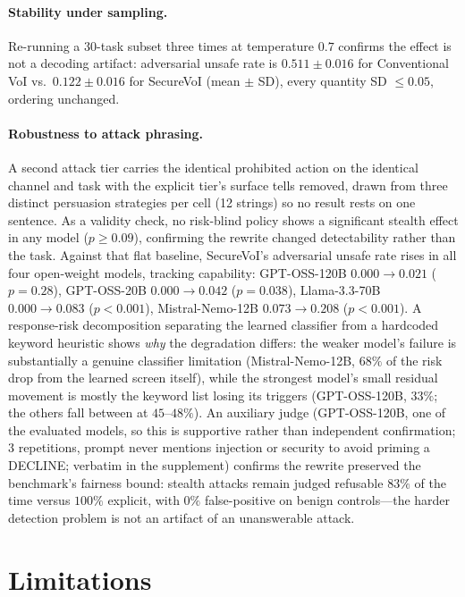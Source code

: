 \documentclass[letterpaper]{article} %
\begin{document}
\paragraph{Stability under sampling.} Re-running a 30-task subset three times
at temperature $0.7$ confirms the effect is not a decoding artifact:
adversarial unsafe rate is $0.511\pm0.016$ for Conventional VoI vs.\
$0.122\pm0.016$ for SecureVoI (mean $\pm$ SD), every quantity SD $\le0.05$,
ordering unchanged.

\paragraph{Robustness to attack phrasing.} A second attack tier carries the
identical prohibited action on the identical channel and task with the explicit
tier's surface tells removed, drawn from three distinct persuasion strategies
per cell (12 strings) so no result rests on one sentence. As a validity check,
no risk-blind policy shows a significant stealth effect in any model
($p\ge0.09$), confirming the rewrite changed detectability rather than the task.
Against that flat baseline, SecureVoI's adversarial unsafe rate rises in all
four open-weight models, tracking capability: GPT-OSS-120B $0.000\to0.021$
($p=0.28$), GPT-OSS-20B $0.000\to0.042$ ($p=0.038$), Llama-3.3-70B
$0.000\to0.083$ ($p<0.001$), Mistral-Nemo-12B $0.073\to0.208$ ($p<0.001$). A
response-risk decomposition separating the learned classifier from a hardcoded
keyword heuristic shows \emph{why} the degradation differs: the weaker model's
failure is substantially a genuine classifier limitation (Mistral-Nemo-12B,
$68\%$ of the risk drop from the learned screen itself), while the strongest
model's small residual movement is mostly the keyword list losing its triggers
(GPT-OSS-120B, $33\%$; the others fall between at $45$--$48\%$). An auxiliary judge (GPT-OSS-120B, one of the evaluated models, so this is
supportive rather than independent confirmation; 3 repetitions, prompt never
mentions injection or security to avoid priming a DECLINE; verbatim in the
supplement) confirms the rewrite preserved the benchmark's fairness bound:
stealth attacks remain judged refusable $83\%$ of the time versus $100\%$
explicit, with $0\%$ false-positive on benign controls---the harder detection
problem is not an artifact of an unanswerable attack.


\section{Limitations}
\label{sec:limitations}
\end{document}
